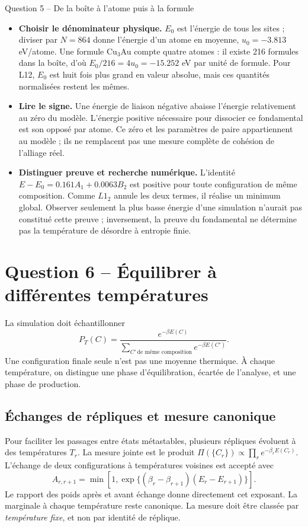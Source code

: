 \documentclass[10pt,a4paper]{article}
\begin{document}
\begin{oral}{Question 5 -- De la boîte à l'atome puis à la formule}
\begin{itemize}
\item \textbf{Choisir le dénominateur physique.} $E_0$ est l'énergie
de tous les sites ; diviser par $N=864$ donne l'énergie d'un atome en
moyenne, $u_0=-3.813$ eV/atome. Une formule Cu$_3$Au compte quatre atomes :
il existe 216 formules dans la boîte, d'où $E_0/216=4u_0=-15.252$
eV par unité de formule. Pour L12, $E_0$ est huit fois plus grand
en valeur absolue, mais ces quantités normalisées restent les mêmes.
\item \textbf{Lire le signe.} Une énergie de liaison négative abaisse
l'énergie relativement au zéro du modèle. L'énergie positive nécessaire
pour dissocier ce fondamental est son opposé par atome. Ce zéro et les
paramètres de paire appartiennent au modèle ; ils ne remplacent pas une
mesure complète de cohésion de l'alliage réel.
\item \textbf{Distinguer preuve et recherche numérique.} L'identité
$E-E_0=0.161A_1+0.0063B_2$ est positive pour toute configuration de même
composition. Comme $L1_2$ annule les deux termes, il réalise un minimum
global. Observer seulement la plus basse énergie d'une simulation
n'aurait pas constitué cette preuve ; inversement, la preuve du
fondamental ne détermine pas la température de désordre à entropie finie.
\end{itemize}
\end{oral}

\section{Question 6 -- Équilibrer à différentes températures}
La simulation doit échantillonner
\[
P_T(C)=\frac{e^{-\beta E(C)}}{\sum_{C'\,\text{de même composition}}e^{-\beta E(C')}}.
\]
Une configuration finale seule n'est pas une moyenne thermique. À chaque
température, on distingue une phase d'équilibration, écartée de l'analyse,
et une phase de production.

\subsection{Échanges de répliques et mesure canonique}
Pour faciliter les passages entre états métastables, plusieurs répliques
évoluent à des températures $T_r$. La mesure jointe est le produit
$\Pi(\{C_r\})\propto\prod_r e^{-\beta_rE(C_r)}$. L'échange de deux
configurations à températures voisines est accepté avec
\begin{equation}
A_{r,r+1}=\min\left[1,
\exp\{(\beta_r-\beta_{r+1})(E_r-E_{r+1})\}\right].
\end{equation}
Le rapport des poids après et avant échange donne directement cet exposant.
La marginale à chaque température reste canonique. La mesure doit être
classée par \emph{température fixe}, et non par identité de réplique.
\end{document}
